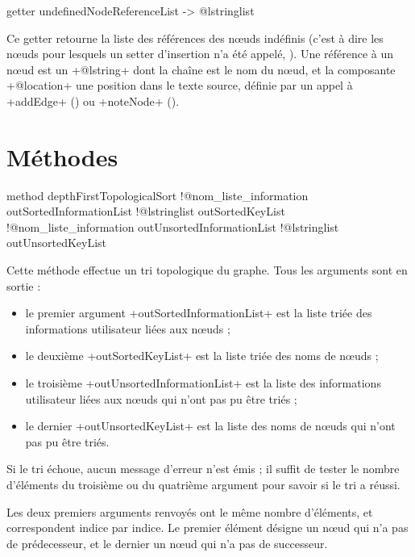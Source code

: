 \begin{galgas}
getter undefinedNodeReferenceList -> @lstringlist 
\end{galgas}

Ce getter retourne la liste des références des nœuds indéfinis (c'est à dire les nœuds pour lesquels un setter d'insertion n'a été appelé, ). Une référence à un nœud est un \ggs+@lstring+ dont la chaîne est le nom du nœud, et la composante \ggs+@location+ une position dans le texte source, définie par un appel à \ggs+addEdge+ () ou \ggs+noteNode+ ().




\section{Méthodes}


\begin{galgas}
method depthFirstTopologicalSort
  !@nom_liste_information outSortedInformationList
  !@lstringlist outSortedKeyList
  !@nom_liste_information outUnsortedInformationList
  !@lstringlist outUnsortedKeyList
\end{galgas}

Cette méthode effectue un tri topologique du graphe. Tous les arguments sont en sortie :
\begin{itemize}
  \item le premier argument \ggs+outSortedInformationList+ est la liste triée des informations utilisateur liées aux nœuds ;
  \item le deuxième \ggs+outSortedKeyList+ est la liste triée des noms de nœuds ;
  \item le troisième \ggs+outUnsortedInformationList+ est la liste des informations utilisateur liées aux nœuds qui n'ont pas pu être triés ;
  \item le dernier \ggs+outUnsortedKeyList+ est la liste des noms de nœuds qui n'ont pas pu être triés.
\end{itemize}

Si le tri échoue, aucun message d'erreur n'est émis ; il suffit de tester le nombre d'éléments du troisième ou du quatrième argument pour savoir si le tri a réussi.

Les deux premiers arguments renvoyés ont le même nombre d'éléments, et correspondent indice par indice. Le premier élément désigne un nœud qui n'a pas de prédecesseur, et le dernier un nœud qui n'a pas de successeur.


